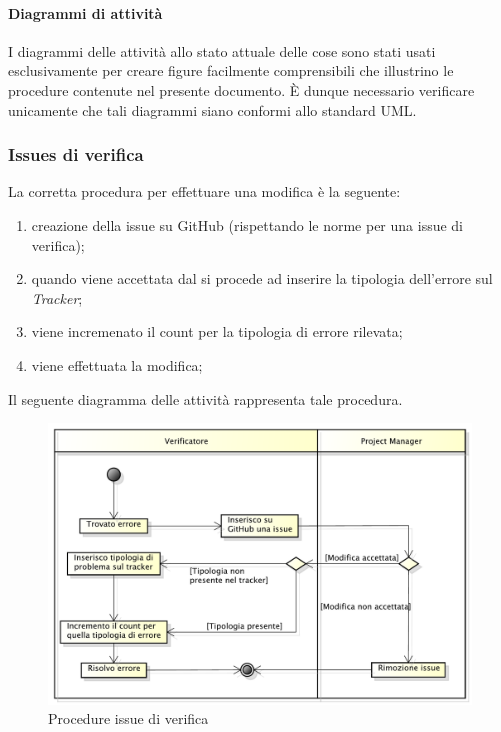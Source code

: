 			\paragraph{Diagrammi di attività}
				I diagrammi delle attività allo stato attuale delle cose sono stati usati esclusivamente per creare figure facilmente comprensibili che illustrino le procedure contenute nel presente documento. È dunque necessario verificare unicamente che tali diagrammi siano conformi allo standard UML.
		\subsubsection{Issues di verifica}
			La corretta procedura per effettuare una modifica è la seguente:
			\begin{enumerate}
				\item creazione della issue su GitHub (rispettando le norme per una issue di verifica);
				\item quando viene accettata dal  si procede ad inserire la tipologia dell'errore sul \textit{Tracker};
				\item viene incremenato il count per la tipologia di errore rilevata;
				\item viene effettuata la modifica;
			\end{enumerate}
			Il seguente diagramma delle attività rappresenta tale procedura.
			\begin{figure}[H]\centering
				\includegraphics[width=\textwidth]{NormeDiProgetto/Pics/ProceduraIssueDiVerifica.pdf}
				\caption{Procedure issue di verifica}
			\end{figure}
